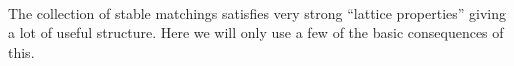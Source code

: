 \documentclass[12pt]{article}
\newtheorem{claim}[definition]{Claim}
\begin{document}

  \paragraph{}

  The collection of stable matchings satisfies very strong ``lattice
  properties'' giving a lot of useful structure.
  Here we will only use a few of the basic consequences of this.
\end{document}
